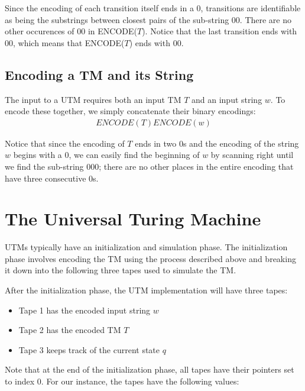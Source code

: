 Since the encoding of each transition itself ends in a $0$, transitions are identifiable as being the substrings between closest pairs of the sub-string $00$. There are no other occurences of $00$ in ENCODE($T$). Notice that the last transition ends with $00$, which means that ENCODE($T$) ends with $00$.

\subsection*{Encoding a TM and its String}
The input to a UTM requires both an input TM $T$ and an input string $w$. To encode these together, we simply concatenate their binary
encodings:
\begin{align} 
ENCODE(T)ENCODE(w) 
\end{align}

Notice that since the encoding of $T$ ends in two 0s and the encoding of the string $w$ begins with a $0$,
we can easily find the beginning of $w$ by scanning right until we find the sub-string $000$; there are no other
places in the entire encoding that have three consecutive 0s.

\newpage

\section*{The Universal Turing Machine}
UTMs typically have an initialization and simulation phase. The initialization phase involves encoding the TM using the process described above and breaking it down into the following three tapes used to simulate the TM.

After the initialization phase, the UTM implementation will have three tapes:
\begin{itemize}
    \item Tape 1 has the encoded input string $w$
    \item Tape 2 has the encoded TM $T$
    \item Tape 3 keeps track of the current state $q$
\end{itemize}


Note that at the end of the initialization phase, all tapes have their pointers set to index 0. For our instance, the tapes have the following values:

\vspace{0.5cm}


